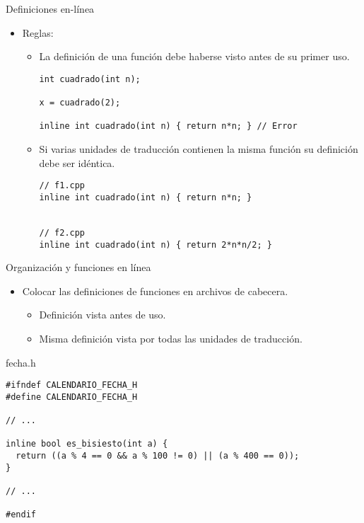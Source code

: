 \begin{frame}[fragile]{Definiciones en-línea}
\begin{itemize}
  \item Reglas:
    \begin{itemize}
      \item La definición de una función  debe haberse visto antes de
            su primer uso.
\begin{lstlisting}
int cuadrado(int n);

x = cuadrado(2);

inline int cuadrado(int n) { return n*n; } // Error
\end{lstlisting}
      \item Si varias unidades de traducción contienen la misma función 
            su definición debe ser idéntica.
\begin{lstlisting}
// f1.cpp
inline int cuadrado(int n) { return n*n; }


// f2.cpp
inline int cuadrado(int n) { return 2*n*n/2; }
\end{lstlisting}
    \end{itemize}
\end{itemize}
\end{frame}

\begin{frame}[fragile]{Organización y funciones en línea}
\begin{itemize}
  \item Colocar las definiciones de funciones  en archivos de cabecera.
    \begin{itemize}
      \item Definición vista antes de uso.
      \item Misma definición vista por todas las unidades de traducción.
    \end{itemize}
\end{itemize}
\begin{block}{fecha.h}
\begin{lstlisting}
#ifndef CALENDARIO_FECHA_H
#define CALENDARIO_FECHA_H

// ...

inline bool es_bisiesto(int a) {
  return ((a % 4 == 0 && a % 100 != 0) || (a % 400 == 0));
}

// ...

#endif
\end{lstlisting}
\end{block}
\end{frame}

